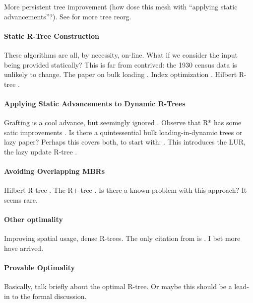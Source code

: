 More persistent tree improvement (how dose this mesh with ``applying static advancements''?).
See \cite{leehsujensencuiteo03} for more tree reorg.


\paragraph{Static R-Tree Construction}
These algorithms are all, by necessity, on-line.
What if we consider the input being provided statically?
This is far from contrived: the 1930 census data is unlikely to change.
The paper on bulk loading \cite{garcialopezleutenegger98a}.
Index optimization \cite{gavrila94}.
Hilbert R-tree \cite{kamelfaloutsos94}.


\paragraph{Applying Static Advancements to Dynamic R-Trees}
Grafting is a cool advance, but seemingly ignored \cite{schrekchen00}.
Observe that R* has some satic improvements \cite{beckmannkriegelschneiderseeger90}.
Is there a quintessential bulk loading-in-dynamic trees or lazy paper?
Perhaps this covers both, to start with: \cite{argehinrichsvahrenholdvitter99}.
This introduces the LUR, the lazy update R-tree \cite{kwonleelee02}.


\paragraph{Avoiding Overlapping MBRs}
Hilbert R-tree \cite{kamelfaloutsos94}.
The R+-tree \cite{sellisroussopoulosfaloutsos87}.
Is there a known problem with this approach? It seems rare.

\paragraph{Other optimality}
Improving spatial usage, dense R-trees.
The only citation from \cite{thebook} is \cite{huanglinlin01}.
I bet more have arrived.

\paragraph{Provable Optimality}
Basically, talk briefly about the optimal R-tree.
Or maybe this should be a lead-in to the formal discussion.
